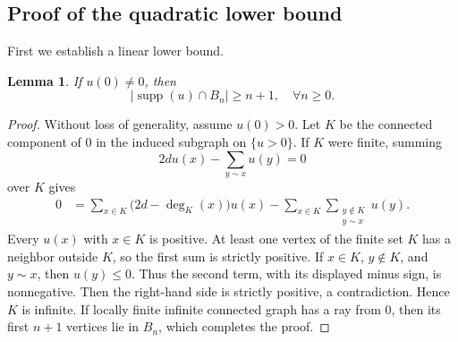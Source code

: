 \documentclass[11pt,reqno]{amsart}
\newcommand{\supp}{\operatorname{supp}}
\newtheorem{lemma}[theorem]{Lemma}
\theoremstyle{definition}
\theoremstyle{plain}
\numberwithin{equation}{section}
\begin{document}
\subsection{Proof of the quadratic lower bound}




First we establish a linear lower bound.
\begin{lemma}\label{lem:ray}
If $u(0)\ne0$, then
\begin{equation}\label{eq:ray-bound}
 |\supp(u)\cap B_n|\ge n+1,\quad \forall n\ge0.
\end{equation}
\end{lemma}
\begin{proof}
    Without loss of generality, assume $u(0)>0$. Let $K$ be the connected component of $0$ in the induced subgraph on $\lbrace u>0\rbrace$. If $K$ were finite, summing
    \begin{equation*}
        2du(x)-\sum_{y\sim x}u(y)=0
    \end{equation*}
    over $K$ gives
    \begin{align*}
 0
 &=\sum_{x\in K}\bigl(2d-\deg_K(x)\bigr)u(x)
   -\sum_{x\in K}\sum_{\substack{y\notin K\\y\sim x}}u(y).
\end{align*}
Every $u(x)$ with $x\in K$ is positive. At least one vertex of the finite
set $K$ has a neighbor outside $K$, so the first sum is strictly positive.
If $x\in K$, $y\notin K$, and $y\sim x$, then $u(y)\le0$. Thus the second term, with
its displayed minus sign, is nonnegative. Then the right-hand side is strictly positive, a contradiction. Hence $K$ is infinite. If locally finite infinite connected graph has a ray from $0$, then its first $n+1$ vertices lie in $B_n$, which completes the proof.
\end{proof}
\end{document}
